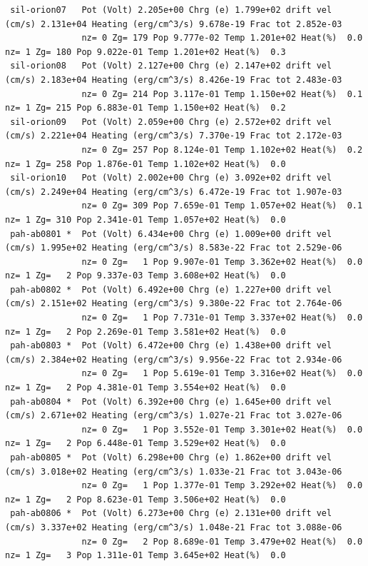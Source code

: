 {\begin{verbatim}
 sil-orion07   Pot (Volt) 2.205e+00 Chrg (e) 1.799e+02 drift vel (cm/s) 2.131e+04 Heating (erg/cm^3/s) 9.678e-19 Frac tot 2.852e-03
               nz= 0 Zg= 179 Pop 9.777e-02 Temp 1.201e+02 Heat(%)  0.0      nz= 1 Zg= 180 Pop 9.022e-01 Temp 1.201e+02 Heat(%)  0.3
 sil-orion08   Pot (Volt) 2.127e+00 Chrg (e) 2.147e+02 drift vel (cm/s) 2.183e+04 Heating (erg/cm^3/s) 8.426e-19 Frac tot 2.483e-03
               nz= 0 Zg= 214 Pop 3.117e-01 Temp 1.150e+02 Heat(%)  0.1      nz= 1 Zg= 215 Pop 6.883e-01 Temp 1.150e+02 Heat(%)  0.2
 sil-orion09   Pot (Volt) 2.059e+00 Chrg (e) 2.572e+02 drift vel (cm/s) 2.221e+04 Heating (erg/cm^3/s) 7.370e-19 Frac tot 2.172e-03
               nz= 0 Zg= 257 Pop 8.124e-01 Temp 1.102e+02 Heat(%)  0.2      nz= 1 Zg= 258 Pop 1.876e-01 Temp 1.102e+02 Heat(%)  0.0
 sil-orion10   Pot (Volt) 2.002e+00 Chrg (e) 3.092e+02 drift vel (cm/s) 2.249e+04 Heating (erg/cm^3/s) 6.472e-19 Frac tot 1.907e-03
               nz= 0 Zg= 309 Pop 7.659e-01 Temp 1.057e+02 Heat(%)  0.1      nz= 1 Zg= 310 Pop 2.341e-01 Temp 1.057e+02 Heat(%)  0.0
 pah-ab0801 *  Pot (Volt) 6.434e+00 Chrg (e) 1.009e+00 drift vel (cm/s) 1.995e+02 Heating (erg/cm^3/s) 8.583e-22 Frac tot 2.529e-06
               nz= 0 Zg=   1 Pop 9.907e-01 Temp 3.362e+02 Heat(%)  0.0      nz= 1 Zg=   2 Pop 9.337e-03 Temp 3.608e+02 Heat(%)  0.0
 pah-ab0802 *  Pot (Volt) 6.492e+00 Chrg (e) 1.227e+00 drift vel (cm/s) 2.151e+02 Heating (erg/cm^3/s) 9.380e-22 Frac tot 2.764e-06
               nz= 0 Zg=   1 Pop 7.731e-01 Temp 3.337e+02 Heat(%)  0.0      nz= 1 Zg=   2 Pop 2.269e-01 Temp 3.581e+02 Heat(%)  0.0
 pah-ab0803 *  Pot (Volt) 6.472e+00 Chrg (e) 1.438e+00 drift vel (cm/s) 2.384e+02 Heating (erg/cm^3/s) 9.956e-22 Frac tot 2.934e-06
               nz= 0 Zg=   1 Pop 5.619e-01 Temp 3.316e+02 Heat(%)  0.0      nz= 1 Zg=   2 Pop 4.381e-01 Temp 3.554e+02 Heat(%)  0.0
 pah-ab0804 *  Pot (Volt) 6.392e+00 Chrg (e) 1.645e+00 drift vel (cm/s) 2.671e+02 Heating (erg/cm^3/s) 1.027e-21 Frac tot 3.027e-06
               nz= 0 Zg=   1 Pop 3.552e-01 Temp 3.301e+02 Heat(%)  0.0      nz= 1 Zg=   2 Pop 6.448e-01 Temp 3.529e+02 Heat(%)  0.0
 pah-ab0805 *  Pot (Volt) 6.298e+00 Chrg (e) 1.862e+00 drift vel (cm/s) 3.018e+02 Heating (erg/cm^3/s) 1.033e-21 Frac tot 3.043e-06
               nz= 0 Zg=   1 Pop 1.377e-01 Temp 3.292e+02 Heat(%)  0.0      nz= 1 Zg=   2 Pop 8.623e-01 Temp 3.506e+02 Heat(%)  0.0
 pah-ab0806 *  Pot (Volt) 6.273e+00 Chrg (e) 2.131e+00 drift vel (cm/s) 3.337e+02 Heating (erg/cm^3/s) 1.048e-21 Frac tot 3.088e-06
               nz= 0 Zg=   2 Pop 8.689e-01 Temp 3.479e+02 Heat(%)  0.0      nz= 1 Zg=   3 Pop 1.311e-01 Temp 3.645e+02 Heat(%)  0.0

\end{verbatim}}
